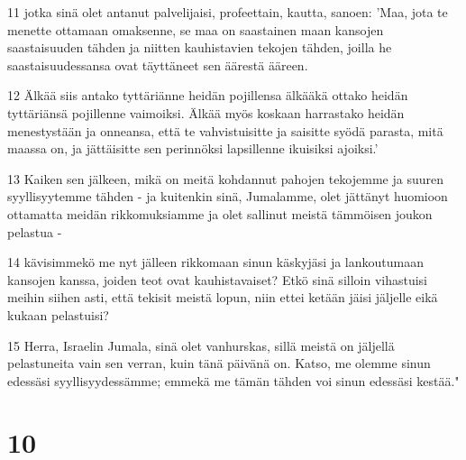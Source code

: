 \par 11 jotka sinä olet antanut palvelijaisi, profeettain, kautta, sanoen: 'Maa, jota te menette ottamaan omaksenne, se maa on saastainen maan kansojen saastaisuuden tähden ja niitten kauhistavien tekojen tähden, joilla he saastaisuudessansa ovat täyttäneet sen äärestä ääreen.
\par 12 Älkää siis antako tyttäriänne heidän pojillensa älkääkä ottako heidän tyttäriänsä pojillenne vaimoiksi. Älkää myös koskaan harrastako heidän menestystään ja onneansa, että te vahvistuisitte ja saisitte syödä parasta, mitä maassa on, ja jättäisitte sen perinnöksi lapsillenne ikuisiksi ajoiksi.'
\par 13 Kaiken sen jälkeen, mikä on meitä kohdannut pahojen tekojemme ja suuren syyllisyytemme tähden - ja kuitenkin sinä, Jumalamme, olet jättänyt huomioon ottamatta meidän rikkomuksiamme ja olet sallinut meistä tämmöisen joukon pelastua -
\par 14 kävisimmekö me nyt jälleen rikkomaan sinun käskyjäsi ja lankoutumaan kansojen kanssa, joiden teot ovat kauhistavaiset? Etkö sinä silloin vihastuisi meihin siihen asti, että tekisit meistä lopun, niin ettei ketään jäisi jäljelle eikä kukaan pelastuisi?
\par 15 Herra, Israelin Jumala, sinä olet vanhurskas, sillä meistä on jäljellä pelastuneita vain sen verran, kuin tänä päivänä on. Katso, me olemme sinun edessäsi syyllisyydessämme; emmekä me tämän tähden voi sinun edessäsi kestää."

\chapter{10}

